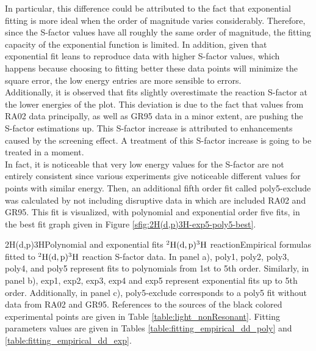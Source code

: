 \documentclass[openany]{book}
\begin{document}
In particular, this difference could be attributed to the fact that exponential fitting is more ideal when the order of magnitude varies considerably. Therefore, since the S-factor values have all roughly the same order of magnitude, the fitting capacity of the exponential function is limited. In addition, given that exponential fit leans to reproduce data with higher S-factor values, which happens because choosing to fitting better these data points will minimize the square error, the low energy entries are more sensible to errors.  \\

Additionally, it is observed that fits slightly overestimate the reaction S-factor at the lower energies of the plot. This deviation is due to the fact that values from RA02 data principally, as well as GR95 data in a minor extent, are pushing the S-factor estimations up. This S-factor increase is attributed to enhancements caused by the screening effect. A treatment of this S-factor increase is going to be treated in a moment. \\

 In fact, it is noticeable that very low energy values for the S-factor are not entirely consistent since various experiments give noticeable different values for points with similar energy. Then, an additional fifth order fit called poly5-exclude was calculated by not including disruptive data in which are included RA02 and GR95. This fit is visualized, with polynomial and exponential order five fits, in the best fit graph given in Figure \ref{sfig:2H(d,p)3H-exp5-poly5-best}.

{2H(d,p)3H}{Polynomial and exponential fits $\mathrm{{}^{2}H(d, p){}^{3}H}$ reaction}{Empirical formulas fitted to $\mathrm{{}^{2}H(d, p){}^{3}H}$ reaction S-factor data. In panel a), poly1, poly2, poly3, poly4, and poly5 represent fits to polynomials from 1st to 5th order.  Similarly, in panel b), exp1, exp2, exp3, exp4 and exp5 represent exponential fits up to 5th order. Additionally, in panel c), poly5-exclude corresponds to a poly5 fit without data from RA02 and GR95. References to the sources of the black colored experimental points are given in Table \ref{table:light_nonResonant}. Fitting parameters values are given in Tables \ref{table:fitting_empirical_dd_poly} and \ref{table:fitting_empirical_dd_exp}.}

\end{document}
